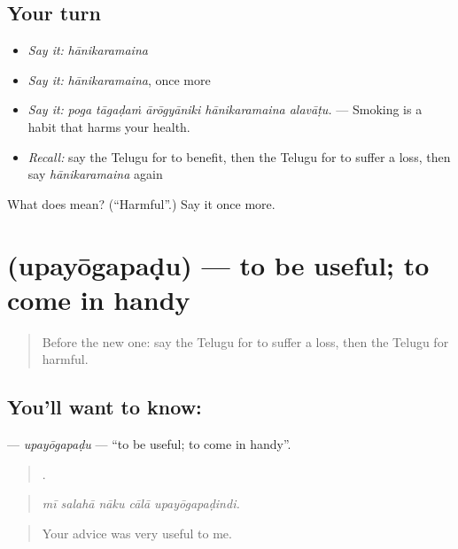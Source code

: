 \subsection*{Your turn}
\begin{itemize}
\raggedright
  \item \emph{Say it:} \emph{hānikaramaina}
  \item \emph{Say it:} \emph{hānikaramaina}, once more
  \item \emph{Say it:} \emph{poga tāgaḍaṁ ārōgyāniki hānikaramaina alavāṭu.} — Smoking is a habit that harms your health.
  \item \emph{Recall:} say the Telugu for to benefit, then the Telugu for to suffer a loss, then say \emph{hānikaramaina} again
\end{itemize}

\begin{tcolorbox}[breakable,colback=teal!4,colframe=teal!35!black,title={Before you move on}]
What does  mean? (\textquotedblleft{}Harmful\textquotedblright{}.) Say it once more.
\end{tcolorbox}
\section[\texorpdfstring{\te{ఉపయోగపడు} (upayōgapaḍu)}{ఉపయోగపడు (upayōgapaḍu)}]{ (upayōgapaḍu) — to be useful; to come in handy}

\label{lesson:TE-C393-upayogapadu}



\begin{quote}
Before the new one: say the Telugu for to suffer a loss, then the Telugu for harmful.
\end{quote}

\subsection*{You'll want to know: }
\textbf{} — \emph{upayōgapaḍu} — \textquotedblleft{}to be useful; to come in handy\textquotedblright{}.

\begin{quote}
    .
\end{quote}

\begin{quote}
\emph{mī salahā nāku cālā upayōgapaḍindi.}
\end{quote}

\begin{quote}
Your advice was very useful to me.
\end{quote}

